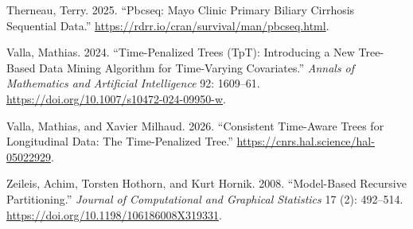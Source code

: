 \documentclass[
]{article}
\newlength{\cslhangindent}
\newenvironment{CSLReferences}[2] %
 {\begin{list}{}{%
  \setlength{\itemindent}{0pt}
  \setlength{\leftmargin}{0pt}
  \setlength{\parsep}{0pt}
  \ifodd #1
   \setlength{\leftmargin}{\cslhangindent}
   \setlength{\itemindent}{-1\cslhangindent}
  \fi
  \setlength{\itemsep}{#2\baselineskip}}}
 {\end{list}}
\begin{document}
\begin{CSLReferences}{1}{0}
Therneau, Terry. 2025. {``Pbcseq: Mayo Clinic Primary Biliary Cirrhosis
Sequential Data.''} \url{https://rdrr.io/cran/survival/man/pbcseq.html}.

Valla, Mathias. 2024. {``Time-Penalized Trees ({TpT}): Introducing a New
Tree-Based Data Mining Algorithm for Time-Varying Covariates.''}
\emph{Annals of Mathematics and Artificial Intelligence} 92: 1609--61.
\url{https://doi.org/10.1007/s10472-024-09950-w}.

Valla, Mathias, and Xavier Milhaud. 2026. {``Consistent Time-Aware Trees
for Longitudinal Data: The Time-Penalized Tree.''}
\url{https://cnrs.hal.science/hal-05022929}.

Zeileis, Achim, Torsten Hothorn, and Kurt Hornik. 2008. {``Model-Based
Recursive Partitioning.''} \emph{Journal of Computational and Graphical
Statistics} 17 (2): 492--514.
\url{https://doi.org/10.1198/106186008X319331}.

\end{CSLReferences}
\end{document}
